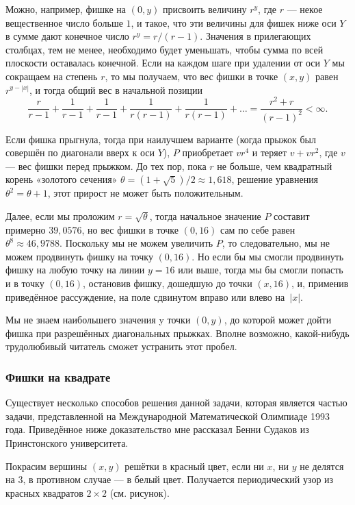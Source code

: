 Можно, например, фишке на $(0, y)$ присвоить величину $r^y$, где $r$ --- некое вещественное число больше $1$, и такое, что эти величины для фишек ниже оси $Y$ в сумме дают конечное число $r^y = r / (r-1)$.
Значения в прилегающих столбцах, тем не менее, необходимо будет уменьшать, чтобы сумма по всей плоскости оставалась конечной.
Если на каждом шаге при удалении от оси $Y$ мы сокращаем на степень $r$, то мы получаем, что вес фишки в точке $(x, y)$ равен $r^{y - |x|}$, и тогда общий вес в начальной позиции 
\[\frac r{r-1} + \frac 1{r-1} +\frac 1{r-1} +\frac 1{r(r-1)} +\frac 1{r(r-1)} + \dots =\frac{r^2+r}{(r-1)^2} <\infty .\]

Если фишка прыгнула, тогда при наилучшем варианте (когда прыжок был совершён по диагонали вверх к оси $Y$), $P$ приобретает $vr^4$ и теряет $v+vr^2$, где $v$ --- вес фишки перед прыжком.
До тех пор, пока $r$ не больше, чем квадратный корень «золотого сечения» $\theta=(1+\sqrt5)/2\approx 1{,}618$, решение уравнения $\theta^2=\theta+1$, этот прирост не может быть положительным.

Далее, если мы проложим $r = \sqrt{\theta}$, тогда начальное значение $P$ составит примерно $39{,}0576$, но вес фишки в точке $(0, 16)$ сам по себе равен $\theta^8\approx 46{,}9788$.
Поскольку мы не можем увеличить $P$, то следовательно, мы не можем продвинуть фишку на точку $(0, 16)$.
Но если бы мы смогли продвинуть фишку на любую точку на линии $y = 16$ или выше, тогда мы бы смогли попасть и в точку $(0, 16)$, остановив фишку, дошедшую до точки $(x, 16)$, и, применив приведённое рассуждение, на поле сдвинутом вправо или влево на~$|x|$.
\heart

Мы не знаем наибольшего значения y точки $(0, y)$, до которой может дойти фишка при разрешённых диагональных прыжках.
Вполне возможно, какой-нибудь трудолюбивый читатель сможет устранить этот пробел.

\subsubsection*{Фишки на квадрате}%

Существует несколько способов решения данной задачи, которая является частью задачи, представленной на Международной Математической Олимпиаде 1993 года.
Приведённое ниже доказательство мне рассказал Бенни Судаков из Принстонского университета.

\medskip

Покрасим вершины $(x, y)$ решётки в красный цвет, если ни $x$, ни $y$ не делятся на $3$, в противном случае --- в белый цвет.
Получается периодический узор из красных квадратов $2\times 2$ (см. рисунок).

